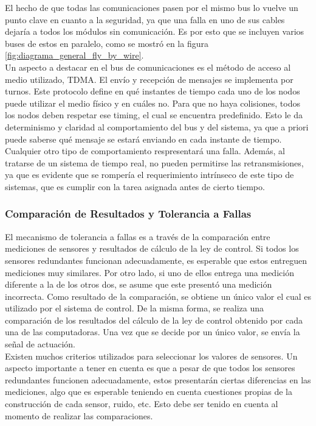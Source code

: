 El hecho de que todas las comunicaciones pasen por el mismo bus lo vuelve un punto clave en cuanto a la seguridad, ya que una falla en uno de sus cables dejaría a todos los módulos sin comunicación. Es por esto que se incluyen varios buses de estos en paralelo, como se mostró en la figura \ref{fig:diagrama_general_fly_by_wire}.\\

Un aspecto a destacar en el bus de comunicaciones es el método de acceso al medio utilizado, TDMA. El envío y recepción de mensajes se implementa por turnos. Este protocolo define en qué instantes de tiempo cada uno de los nodos puede utilizar el medio físico y en cuáles no. Para que no haya colisiones, todos los nodos deben respetar ese timing, el cual se encuentra predefinido. Esto le da determinismo y claridad al comportamiento del bus y del sistema, ya que a priori puede saberse qué mensaje se estará enviando en cada instante de tiempo. Cualquier otro tipo de comportamiento respresentará una falla. Además, al tratarse de un sistema de tiempo real, no pueden permitirse las retransmisiones, ya que es evidente que se rompería el requerimiento intrínseco de este tipo de sistemas, que es cumplir con la tarea asignada antes de cierto tiempo.

\subsubsection{Comparación de Resultados y Tolerancia a Fallas}

El mecanismo de tolerancia a fallas es a través de la comparación entre mediciones de sensores y resultados de cálculo de la ley de control. Si todos los sensores redundantes funcionan adecuadamente, es esperable que estos entreguen mediciones muy similares. Por otro lado, si uno de ellos entrega una medición diferente a la de los otros dos, se asume que este presentó una medición incorrecta. Como resultado de la comparación, se obtiene un único valor el cual es utilizado por el sistema de control. De la misma forma, se realiza una comparación de los resultados del cálculo de la ley de control obtenido por cada una de las computadoras. Una vez que se decide por un único valor, se envía la señal de actuación.\\

Existen muchos criterios utilizados para seleccionar los valores de sensores. Un aspecto importante a tener en cuenta es que a pesar de que todos los sensores redundantes funcionen adecuadamente, estos presentarán ciertas diferencias en las mediciones, algo que es esperable teniendo en cuenta cuestiones propias de la construcción de cada sensor, ruido, etc. Esto debe ser tenido en cuenta al momento de realizar las comparaciones.\\

